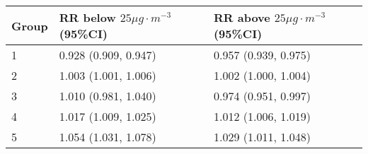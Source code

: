 \begin{tabular}{lll}
  \hline
Group & RR below $25 \mu g \cdot m^{-3}$ (95\%CI) & RR above $25 \mu g \cdot m^{-3}$ (95\%CI) \\ 
  \hline
   1 & 0.928 (0.909, 0.947) & 0.957 (0.939, 0.975) \\ 
     2 & 1.003 (1.001, 1.006) & 1.002 (1.000, 1.004) \\ 
     3 & 1.010 (0.981, 1.040) & 0.974 (0.951, 0.997) \\ 
     4 & 1.017 (1.009, 1.025) & 1.012 (1.006, 1.019) \\ 
     5 & 1.054 (1.031, 1.078) & 1.029 (1.011, 1.048) \\ 
   \hline
\end{tabular}

